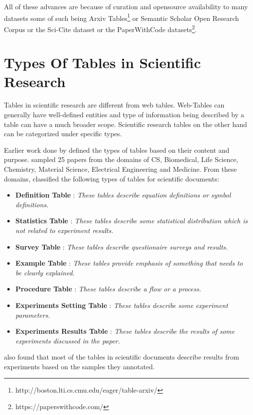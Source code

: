 All of these advances are because of curation and opensource availability to many datasets some of such being Arxiv Tables\footnote{http://boston.lti.cs.cmu.edu/eager/table-arxiv/} or Semantic Scholar Open Research Corpus\parencite{ammar-etal-2018-construction} or the Sci-Cite dataset \parencite{cohan2019structural} or the PaperWithCode datasets\footnote{https://paperswithcode.com/}.


\section{Types Of Tables in Scientific Research}
\label{relatedwork:table-type}
Tables in scientific research are different from web tables. Web-Tables can generally have well-defined entities and type of information being described by a table can have a much broader scope. Scientific research tables on the other hand can be categorized under specific types. 

Earlier work done by \cite{kim2012scientific} defined the types of tables based on their content and purpose. \cite{kim2012scientific} sampled 25 papers from the domains of CS, Biomedical, Life Science, Chemistry, Material Science, Electrical Engineering and Medicine. From these domains, \cite{kim2012scientific} classified the following types of tables for scientific documents:
\begin{itemize}
    \item \textbf{Definition Table} : \textit{These tables describe equation definitions or symbol definitions.}
    \item \textbf{Statistics Table} : \textit{These tables describe some statistical distribution which is not related to experiment results. }
    \item \textbf{Survey Table } : \textit{These tables describe questionaire surveys and results. }
    \item \textbf{Example Table } : \textit{These tables provide emphasis of something that needs to be clearly explained. }
    \item \textbf{Procedure Table} : \textit{These tables describe a flow or a process. }
    \item \textbf{Experiments Setting Table } : \textit{These tables describe some experiment parameters. }
    \item \textbf{Experiments Results Table } : \textit{These tables describe the results of some experiments discussed in the paper. }
\end{itemize}

\cite{kim2012scientific} also found that most of the tables in scientific documents describe results from experiments based on the samples they annotated. 



